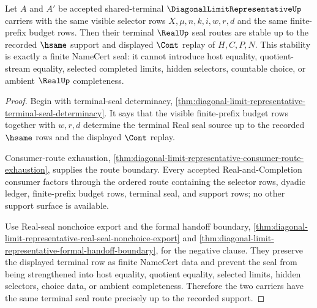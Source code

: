 \begin{theorem}
\label{thm:diagonal-limit-representative-terminal-seal-stability}
Let $A$ and $A'$ be accepted shared-terminal $\DiagonalLimitRepresentativeUp$ carriers with the same visible selector rows $X,\mu,n,k,i,w,r,d$ and the same finite-prefix budget rows. Then their terminal $\RealUp$ seal routes are stable up to the recorded $\hsame$ support and displayed $\Cont$ replay of $H,C,P,N$. This stability is exactly a finite NameCert seal: it cannot introduce host equality, quotient-stream equality, selected completed limits, hidden selectors, countable choice, or ambient $\RealUp$ completeness.
\end{theorem}
\begin{proof}
Begin with terminal-seal determinacy, \autoref{thm:diagonal-limit-representative-terminal-seal-determinacy}. It says that the visible finite-prefix budget rows together with $w,r,d$ determine the terminal Real seal source up to the recorded $\hsame$ rows and the displayed $\Cont$ replay.

Consumer-route exhaustion, \autoref{thm:diagonal-limit-representative-consumer-route-exhaustion}, supplies the route boundary. Every accepted Real-and-Completion consumer factors through the ordered route containing the selector rows, dyadic ledger, finite-prefix budget rows, terminal seal, and support rows; no other support surface is available.

Use Real-seal nonchoice export and the formal handoff boundary, \autoref{thm:diagonal-limit-representative-real-seal-nonchoice-export} and \autoref{thm:diagonal-limit-representative-formal-handoff-boundary}, for the negative clause. They preserve the displayed terminal row as finite NameCert data and prevent the seal from being strengthened into host equality, quotient equality, selected limits, hidden selectors, choice data, or ambient completeness. Therefore the two carriers have the same terminal seal route precisely up to the recorded support.
\end{proof}
